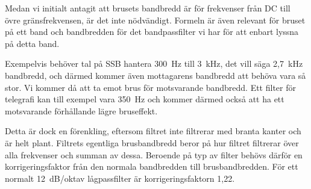 Medan vi initialt antagit att brusets bandbredd är för frekvenser
från DC till övre gränsfrekvensen, är det inte nödvändigt.
Formeln är även relevant för bruset på ett band och bandbredden för det
bandpassfilter vi har för att enbart lyssna på detta band.

Exempelvis behöver tal på SSB hantera 300~Hz till 3~kHz, det vill säga 2,7~kHz
bandbredd, och därmed kommer även mottagarens bandbredd att behöva vara så stor.
Vi kommer då att ta emot brus för motsvarande bandbredd.
Ett filter för telegrafi kan till exempel vara 350~Hz och kommer därmed också att ha ett
motsvarande förhållande lägre bruseffekt.

Detta är dock en förenkling, eftersom filtret inte filtrerar med branta kanter
och är helt plant.
Filtrets egentliga brusbandbredd beror på hur filtret filtrerar över
alla frekvenser och summan av dessa.
Beroende på typ av filter behövs därför en korrigeringsfaktor
från den normala bandbredden till brusbandbredden.
För ett normalt 12~dB/oktav lågpassfilter är korrigeringsfaktorn 1,22.
